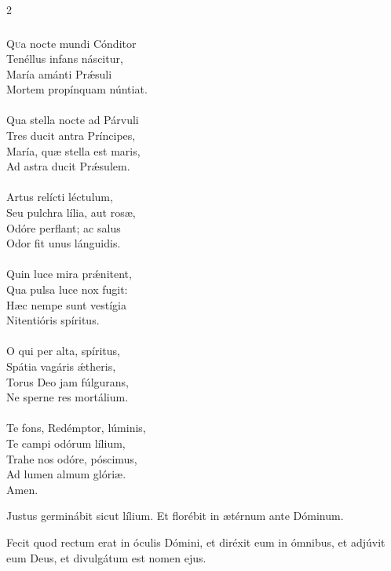 \documentclass[9pt,twoside]{extarticle}
\begin{document}
\begin{multicols}{2}
\subsubsection*{\center {}}
\begin{center}\end{center}
\lettrine{Q}ua nocte mundi Cónditor\\
Tenéllus infans náscitur,\\
María amánti Prǽsuli\\
Mortem propínquam núntiat.\\
\\
Qua stella nocte ad Párvuli\\
Tres ducit antra Príncipes,\\
María, quæ stella est maris,\\
Ad astra ducit Prǽsulem.\\
\\
Artus relícti léctulum,\\
Seu pulchra lília, aut rosæ,\\
Odóre perflant; ac salus\\
Odor fit unus lánguidis.\\
\\
Quin luce mira prǽnitent,\\
Qua pulsa luce nox fugit:\\
Hæc nempe sunt vestígia\\
Nitentióris spíritus.\\
\\
O qui per alta, spíritus,\\
Spátia vagáris ǽtheris,\\
Torus Deo jam fúlgurans,\\
Ne sperne res mortálium.\\
\\
Te fons, Redémptor, lúminis,\\
Te campi odórum lílium,\\
Trahe nos odóre, póscimus,\\
Ad lumen almum glóriæ.\\
Amen.

\begin{tightlist}{}
\item {} Justus germinábit sicut lílium.  Et florébit in ætérnum ante Dóminum.
\item {} Fecit quod rectum erat in óculis Dómini, et diréxit eum in ómnibus, et adjúvit eum Deus, et divulgátum est nomen ejus.
\end{tightlist}


\end{multicols}
\end{document}

